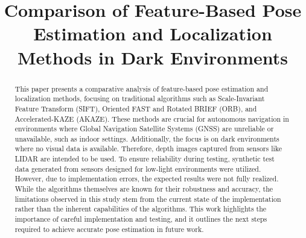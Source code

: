 \documentclass[conference, a4paper]{IEEEtran}
\begin{document}


\title{Comparison of Feature-Based Pose Estimation and Localization Methods in Dark Environments}

\author{
}

\maketitle

\begin{abstract}
This paper presents a comparative analysis of feature-based pose estimation and localization methods, focusing on traditional algorithms such as Scale-Invariant Feature Transform (SIFT), Oriented FAST and Rotated BRIEF (ORB), and Accelerated-KAZE (AKAZE). These methods are crucial for autonomous navigation in environments where Global Navigation Satellite Systems (GNSS) are unreliable or unavailable, such as indoor settings. Additionally, the focus is on dark environments where no visual data is available. Therefore, depth images captured from sensors like LIDAR are intended to be used. To ensure reliability during testing, synthetic test data generated from sensors designed for low-light environments were utilized. However, due to implementation errors, the expected results were not fully realized. While the algorithms themselves are known for their robustness and accuracy, the limitations observed in this study stem from the current state of the implementation rather than the inherent capabilities of the algorithms. This work highlights the importance of careful implementation and testing, and it outlines the next steps required to achieve accurate pose estimation in future work.
\end{abstract}

\IEEEpeerreviewmaketitle
\end{document}
